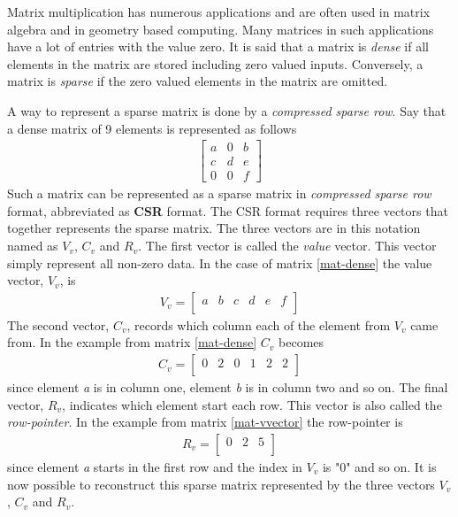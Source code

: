 Matrix multiplication has numerous applications and are often used in matrix algebra and in geometry based computing.
Many matrices in such applications have a lot of entries with the value zero.
It is said that a matrix is \textit{dense} if all elements in the matrix are stored including zero valued inputs.
Conversely, a matrix is \textit{sparse} if the zero valued elements in the matrix are omitted.

A way to represent a sparse matrix is done by a \textit{compressed sparse row}.
Say that a dense matrix of 9 elements is represented as follows
\begin{gather}
	\begin{bmatrix}
		a & 0 & b \\[0.3em]
		c & d & e \\[0.3em]
		0 & 0 & f
	\end{bmatrix}
	\label{mat-dense}
\end{gather}
Such a matrix can be represented as a sparse matrix in \textit{compressed sparse row} format, abbreviated as \textbf{CSR} format.
The CSR format requires three vectors that together represents the sparse matrix.
The three vectors are in this notation named as $V_v$, $C_v$ and $R_v$.
The first vector is called the \textit{value} vector.
This vector simply represent all non-zero data.
In the case of matrix \ref{mat-dense} the value vector, $V_v$, is
\begin{gather}
	V_v =
	\begin{bmatrix}
		a & b & c & d & e & f\\[0.3em]
	\end{bmatrix}
\end{gather}
The second vector, $C_v$, records which column each of the element from $V_v$ came from.
In the example from matrix \ref{mat-dense} $C_v$ becomes
\begin{gather}
	C_v =
	\begin{bmatrix}
		0 & 2 & 0 & 1 & 2 & 2\\[0.3em]
	\end{bmatrix}
	\label{mat-vvector}
\end{gather}
since element \textit{a} is in column one, element \textit{b} is in column two and so on.
The final vector, $R_v$, indicates which element start each row.
This vector is also called the \textit{row-pointer}.
In the example from matrix \ref{mat-vvector} the row-pointer is
\begin{gather}
	R_v =
	\begin{bmatrix}
		0 & 2 & 5\\[0.3em]
	\end{bmatrix}
\end{gather}
since element \textit{a} starts in the first row and the index in $V_v$ is "0" and so on.
It is now possible to reconstruct this sparse matrix represented by the three vectors $V_v$, $C_v$ and $R_v$.


